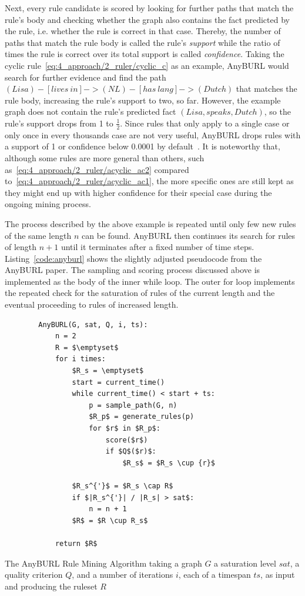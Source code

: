 Next, every rule candidate is scored by looking for further paths that match the rule's body and checking whether the graph also contains the fact predicted by the rule, i.e. whether the rule is correct in that case. Thereby, the number of paths that match the rule body is called the rule's \emph{support} while the ratio of times the rule is correct over its total support is called \emph{confidence}. Taking the cyclic rule~\ref{eq:4_approach/2_ruler/cyclic_c} as an example, AnyBURL would search for further evidence and find the path $(Lisa) - [lives~in] -> (NL) - [has~lang] -> (Dutch)$ that matches the rule body, increasing the rule's support to two, so far. However, the example graph does not contain the rule's predicted fact $(Lisa, speaks, Dutch)$, so the rule's support drops from 1 to $\frac{1}{2}$. Since rules that only apply to a single case or only once in every thousands case are not very useful, AnyBURL drops rules with a support of 1 or confidence below 0.0001 by default~\cite{AnyBURL}. It is noteworthy that, although some rules are more general than others, such as~\ref{eq:4_approach/2_ruler/acyclic_ac2} compared to~\ref{eq:4_approach/2_ruler/acyclic_ac1}, the more specific ones are still kept as they might end up with higher confidence for their special case during the ongoing mining process.

The process described by the above example is repeated until only few new rules of the same length $n$ can be found. AnyBURL then continues its search for rules of length $n + 1$ until it terminates after a fixed number of time steps. Listing~\ref{code:anyburl} shows the slightly adjusted pseudocode from the AnyBURL paper. The sampling and scoring process discussed above is implemented as the body of the inner while loop. The outer for loop implements the repeated check for the saturation of rules of the current length and the eventual proceeding to rules of increased length.


\begin{listing}[t]
    \begin{lstlisting}
        AnyBURL(G, sat, Q, i, ts):
            n = 2
            R = $\emptyset$
            for i times:
                $R_s = \emptyset$
                start = current_time()
                while current_time() < start + ts:
                    p = sample_path(G, n)
                    $R_p$ = generate_rules(p)
                    for $r$ in $R_p$:
                        score($r$)
                        if $Q$($r)$:
                            $R_s$ = $R_s \cup {r}$

                $R_s^{'}$ = $R_s \cap R$
                if $|R_s^{'}| / |R_s| > sat$:
                    n = n + 1
                $R$ = $R \cup R_s$

            return $R$
    \end{lstlisting}
    \caption{The AnyBURL Rule Mining Algorithm taking a graph $G$ a saturation level $sat$, a quality criterion $Q$, and a number of iterations $i$, each of a timespan $ts$, as input and producing the ruleset $R$}
    \label{code:anyburl}
\end{listing}

